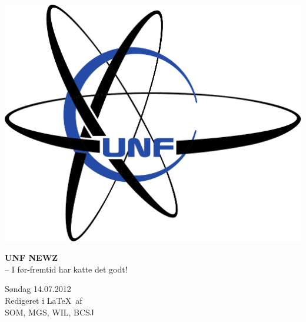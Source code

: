 \begin{minipage}[b]{0.2\linewidth}
\includegraphics[width=0.5\linewidth]{unflogo.pdf}
\end{minipage}
\begin{minipage}[b]{0.35\linewidth}
\Huge \textbf{UNF NEWZ} \\
\Large -- I før-fremtid har katte det godt!
\end{minipage}
\begin{minipage}[b]{0.4\linewidth}
\Large Søndag 14.07.2012 \\
\normalsize Redigeret i \LaTeX\ af \\ SOM, MGS, WIL, BCSJ

\end{minipage}